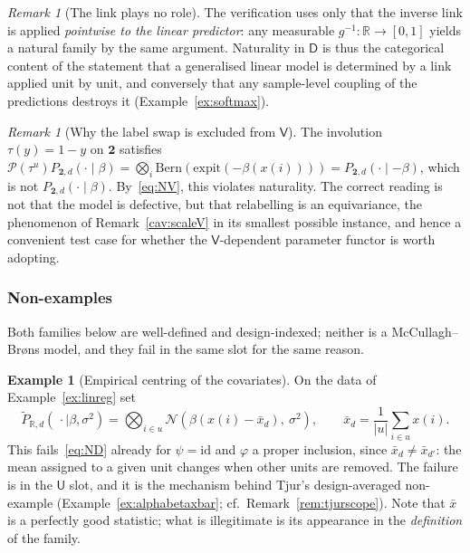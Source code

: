 \documentclass[11pt,a4paper]{article}
\theoremstyle{plain}
\theoremstyle{definition}
\newtheorem{example}[theorem]{Example}
\theoremstyle{remark}
\newtheorem{remark}[theorem]{Remark}
\newcommand{\cat}[1]{\mathsf{#1}}
\newcommand{\catU}{\cat{U}}
\newcommand{\catV}{\cat{V}}
\newcommand{\catD}{\cat{D}}
\newcommand{\Prb}{\mathcal{P}}
\newcommand{\id}{\mathrm{id}}
\newcommand{\R}{\mathbb{R}}
\newcommand{\Norm}{\mathcal{N}}
\newcommand{\Bern}{\mathrm{Bern}}
\newcommand{\expit}{\mathrm{expit}}
\begin{document}
\begin{remark}[The link plays no role]\label{rem:glm}
The verification uses only that the inverse link is applied \emph{pointwise to
the linear predictor}: any measurable $g^{-1}\colon\R\to[0,1]$ yields a
natural family by the same argument. Naturality in $\catD$ is thus the
categorical content of the statement that a generalised linear model is
determined by a link applied unit by unit, and conversely that any
sample-level coupling of the predictions destroys it (Example~\ref{ex:softmax}).
\end{remark}

\begin{remark}[Why the label swap is excluded from $\catV$]
The involution $\tau(y)=1-y$ on $\mathbf{2}$ satisfies
$\Prb(\tau^{u})P_{\mathbf{2},d}(\cdot\mid\beta)
= \bigotimes_{i}\Bern(\expit(-\beta(x(i))))
= P_{\mathbf{2},d}(\cdot\mid -\beta)$, which is not
$P_{\mathbf{2},d}(\cdot\mid\beta)$. By~\eqref{eq:NV}, this violates naturality.
The correct reading is not that the model is defective, but that relabelling is
an equivariance, the phenomenon of Remark~\ref{cav:scaleV} in its smallest
possible instance, and hence a convenient test case for whether the
$\catV$-dependent parameter functor is worth adopting.
\end{remark}

\subsubsection*{Non-examples}

Both families below are well-defined and design-indexed; neither is a
McCullagh--Br\o ns model, and they fail in the same slot for the same reason.

\begin{example}[Empirical centring of the covariates]\label{ex:centring}
On the data of Example~\ref{ex:linreg} set
\[
\widetilde{P}_{\R,d}(\,\cdot\mid\beta,\sigma^{2})
= \bigotimes_{i\in u}\Norm(\beta(x(i)-\bar{x}_{d}),\ \sigma^{2}),
\qquad
\bar{x}_{d} = \frac{1}{|u|}\sum_{i\in u} x(i).
\]
This fails~\eqref{eq:ND} already for $\psi=\id$ and $\varphi$ a proper
inclusion, since $\bar{x}_{d} \neq \bar{x}_{d'}$: the mean assigned to a given
unit changes when other units are removed. The failure is in the $\catU$ slot,
and it is the mechanism behind Tjur's design-averaged non-example
(Example~\ref{ex:alphabetaxbar}; cf.\ Remark~\ref{rem:tjurscope}). Note that $\bar{x}$ is a perfectly good
statistic; what is illegitimate is its appearance in the \emph{definition} of
the family.
\end{example}
\end{document}
